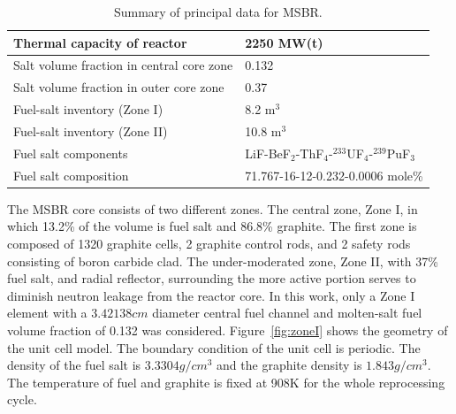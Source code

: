 \documentclass{anstrans}
\begin{document}
\captionsetup[table]{
        labelsep = newline,
        name = TABLE, justification=justified,
        singlelinecheck=false,%
        labelsep=colon,%
skip = \medskipamount}
\begin{table}[h!]
        \begin{tabularx}{\linewidth}{l X} \toprule 
                Thermal capacity of reactor           & 2250 MW(t)
                \\ \midrule
                Salt volume fraction in central core zone     & 0.132
                \\ \midrule
                Salt volume fraction in outer core zone       & 0.37
                \\ \midrule
                Fuel-salt inventory (Zone I)                  & 8.2 m$^3$	
                \\ \midrule
                Fuel-salt inventory (Zone II)                 & 10.8 m$^3$	
                \\ \midrule
                Fuel salt components                  & 
                LiF-BeF$_2$-ThF$_4$-$^{233}$UF$_4$-$^{239}$PuF$_3$	\\ 
                \midrule
                Fuel salt composition                 & 
                71.767-16-12-0.232-0.0006 mole\%
                \\
                \bottomrule
        \end{tabularx}
        \caption{Summary of principal data for MSBR.}
        \label{tab:data}
\end{table}

The \gls{MSBR} core consists of two different zones. The central 
zone, Zone I, in which 13.2\% of the volume is fuel salt and 86.8\% graphite. 
The first zone is composed of 1320 graphite cells, 2 graphite control rods, and 
2 safety rods consisting of boron carbide clad. The under-moderated zone, Zone 
II, with 37\% fuel salt, and radial reflector, surrounding the more active 
portion serves to diminish neutron leakage from the reactor core. In this work, 
only a Zone I element with a $3.42138 cm$ diameter central fuel channel and molten-salt 
fuel volume fraction of 0.132 was considered. Figure~\ref{fig:zoneI} shows the 
geometry of the unit cell model. The boundary condition of the unit cell is 
periodic. The density of the fuel salt is $3.3304 g/cm^3$ and the graphite density is 
$1.843 g/cm^3$. The temperature of fuel and graphite is fixed at 908K for the whole 
reprocessing cycle\cite{robertson_conceptual_1971}.
\end{document}
